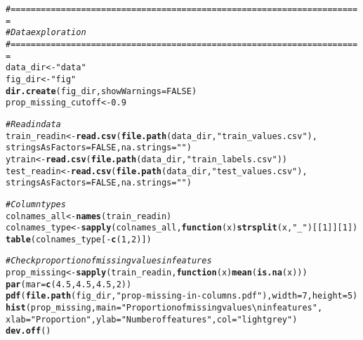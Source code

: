 \documentclass{article}\usepackage[]{graphicx}\usepackage[]{color}
\makeatletter
\newcommand{\hlnum}[1]{\textcolor[rgb]{0.686,0.059,0.569}{#1}}%
\newcommand{\hlstr}[1]{\textcolor[rgb]{0.192,0.494,0.8}{#1}}%
\newcommand{\hlcom}[1]{\textcolor[rgb]{0.678,0.584,0.686}{\textit{#1}}}%
\newcommand{\hlopt}[1]{\textcolor[rgb]{0,0,0}{#1}}%
\newcommand{\hlstd}[1]{\textcolor[rgb]{0.345,0.345,0.345}{#1}}%
\newcommand{\hlkwa}[1]{\textcolor[rgb]{0.161,0.373,0.58}{\textbf{#1}}}%
\newcommand{\hlkwb}[1]{\textcolor[rgb]{0.69,0.353,0.396}{#1}}%
\newcommand{\hlkwc}[1]{\textcolor[rgb]{0.333,0.667,0.333}{#1}}%
\newcommand{\hlkwd}[1]{\textcolor[rgb]{0.737,0.353,0.396}{\textbf{#1}}}%
\newenvironment{kframe}{%
 \def\at@end@of@kframe{}%
 \ifinner\ifhmode%
  \def\at@end@of@kframe{\end{minipage}}%
  \begin{minipage}{\columnwidth}%
 \fi\fi%
 \def\FrameCommand##1{\hskip\@totalleftmargin \hskip-\fboxsep
 \colorbox{shadecolor}{##1}\hskip-\fboxsep
     \hskip-\linewidth \hskip-\@totalleftmargin \hskip\columnwidth}%
 \MakeFramed {\advance\hsize-\width
   \@totalleftmargin\z@ \linewidth\hsize
   \@setminipage}}%
 {\par\unskip\endMakeFramed%
 \at@end@of@kframe}
\newenvironment{knitrout}{}{} %
\makeatother
\begin{document}
\begin{knitrout}
\color{fgcolor}\begin{kframe}
\begin{alltt}
\hlcom{#======================================================================}
\hlcom{# Data exploration}
\hlcom{#======================================================================}
\hlstd{data_dir} \hlkwb{<-} \hlstr{"data"}
\hlstd{fig_dir} \hlkwb{<-} \hlstr{"fig"}
\hlkwd{dir.create}\hlstd{(fig_dir,} \hlkwc{showWarnings} \hlstd{=} \hlnum{FALSE}\hlstd{)}
\hlstd{prop_missing_cutoff} \hlkwb{<-} \hlnum{0.9}

\hlcom{# Read in data}
\hlstd{train_readin} \hlkwb{<-} \hlkwd{read.csv}\hlstd{(}\hlkwd{file.path}\hlstd{(data_dir,} \hlstr{"train_values.csv"}\hlstd{),}
                         \hlkwc{stringsAsFactors} \hlstd{=} \hlnum{FALSE}\hlstd{,} \hlkwc{na.strings} \hlstd{=} \hlstr{""}\hlstd{)}
\hlstd{ytrain} \hlkwb{<-} \hlkwd{read.csv}\hlstd{(}\hlkwd{file.path}\hlstd{(data_dir,} \hlstr{"train_labels.csv"}\hlstd{))}
\hlstd{test_readin} \hlkwb{<-} \hlkwd{read.csv}\hlstd{(}\hlkwd{file.path}\hlstd{(data_dir,} \hlstr{"test_values.csv"}\hlstd{),}
                        \hlkwc{stringsAsFactors} \hlstd{=} \hlnum{FALSE}\hlstd{,} \hlkwc{na.strings} \hlstd{=} \hlstr{""}\hlstd{)}

\hlcom{# Column types}
\hlstd{colnames_all} \hlkwb{<-} \hlkwd{names}\hlstd{(train_readin)}
\hlstd{colnames_type} \hlkwb{<-} \hlkwd{sapply}\hlstd{(colnames_all,} \hlkwa{function}\hlstd{(}\hlkwc{x}\hlstd{)} \hlkwd{strsplit}\hlstd{(x,} \hlstr{"_"}\hlstd{)[[}\hlnum{1}\hlstd{]][}\hlnum{1}\hlstd{])}
\hlkwd{table}\hlstd{(colnames_type[}\hlopt{-}\hlkwd{c}\hlstd{(}\hlnum{1}\hlstd{,} \hlnum{2}\hlstd{)])}

\hlcom{# Check proportion of missing values in features}
\hlstd{prop_missing} \hlkwb{<-} \hlkwd{sapply}\hlstd{(train_readin,} \hlkwa{function}\hlstd{(}\hlkwc{x}\hlstd{)} \hlkwd{mean}\hlstd{(}\hlkwd{is.na}\hlstd{(x)))}
\hlkwd{par}\hlstd{(}\hlkwc{mar} \hlstd{=} \hlkwd{c}\hlstd{(}\hlnum{4.5}\hlstd{,} \hlnum{4.5}\hlstd{,} \hlnum{4.5}\hlstd{,} \hlnum{2}\hlstd{))}
\hlkwd{pdf}\hlstd{(}\hlkwd{file.path}\hlstd{(fig_dir,} \hlstr{"prop-missing-in-columns.pdf"}\hlstd{),} \hlkwc{width} \hlstd{=} \hlnum{7}\hlstd{,} \hlkwc{height} \hlstd{=} \hlnum{5}\hlstd{)}
\hlkwd{hist}\hlstd{(prop_missing,} \hlkwc{main} \hlstd{=} \hlstr{"Proportion of missing values\textbackslash{}nin features"}\hlstd{,}
     \hlkwc{xlab} \hlstd{=} \hlstr{"Proportion"}\hlstd{,} \hlkwc{ylab} \hlstd{=} \hlstr{"Number of features"}\hlstd{,} \hlkwc{col} \hlstd{=} \hlstr{"lightgrey"}\hlstd{)}
\hlkwd{dev.off}\hlstd{()}


\end{alltt}
\end{kframe}
\end{knitrout}
\end{document}
